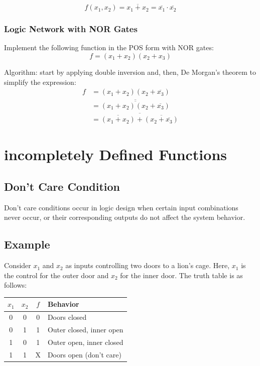 \documentclass[12pt,openany]{book}
\begin{document}
			      	$$f(x_1, x_2) = \overline{x_1 + x_2} = \overline{x_1} \cdot \overline{x_2}$$
			      	
			      	        
			      	
			      	\subsubsection*{Logic Network with NOR Gates}
			      	Implement the following function in the POS form with NOR gates:
			      	\begin{equation}
			      		f = (x_1 + x_2)(x_2 + x_3)
			      	\end{equation}
			      	
			      	Algorithm: start by applying double inversion and, then, De Morgan's theorem to simplify the expression:
			      	\begin{align}
			      		f & = (x_1 + x_2)(x_2 + \overline{x_3})                                     \\
			      		  & = \overline{\overline{(x_1 + x_2)(x_2 + \overline{x_3})}}               \\
			      		  & = \overline{\overline{(x_1 + x_2)} + \overline{(x_2 + \overline{x_3})}} 
			      	\end{align}
			      	\section{incompletely Defined Functions}
			      	\subsection{Don't Care Condition}
			      	Don't care conditions occur in logic design when certain input combinations never occur, or their corresponding outputs do not affect the system behavior. 
			      	
			      	\subsection{Example}
			      	Consider \( x_1 \) and \( x_2 \) as inputs controlling two doors to a lion's cage. Here, \( x_1 \) is the control for the outer door and \( x_2 \) for the inner door. The truth table is as follows:
			      	
			      	\begin{center}
			      		\begin{tabular}{cc|c|l}
			      			\( x_1 \) & \( x_2 \) & \( f \) & Behavior                 \\
			      			\hline
			      			0         & 0         & 0       & Doors closed             \\
			      			0         & 1         & 1       & Outer closed, inner open \\
			      			1         & 0         & 1       & Outer open, inner closed \\
			      			1         & 1         & X       & Doors open (don't care)  \\
			      		\end{tabular}
			      	\end{center}
			      	
\end{document}
